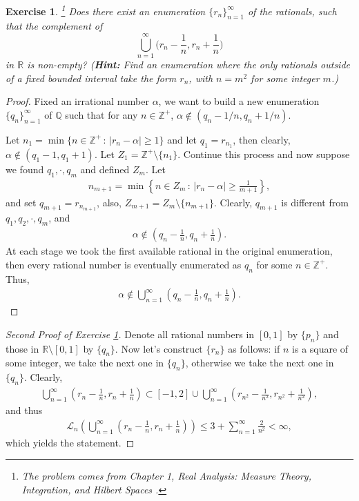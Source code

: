 \documentclass[11pt]{book}
\newtheorem{exercise}{Exercise}[chapter]
\theoremstyle{definition}
\numberwithin{equation}{chapter}
\def\L{{\mathcal L}}
\begin{document}
\begin{exercise}\label{exercise_115}\footnote{The problem comes from Chapter 1, {\em Real Analysis: Measure Theory, Integration, and Hilbert Spaces} \cite{8}.} Does there exist an enumeration $\{ r_n\}^\infty_{n=1}$ of the rationals, such that the complement of
$$
\bigcup^\infty_{n=1}\biggr(r_n-\frac{1}{n},r_n+\frac{1}{n}\biggr)
$$
in $\mathbb{R}$ is non-empty? ({\bf Hint:} Find an enumeration where the only rationals outside of a fixed bounded interval take the form $r_n$, with $n = m^2$ for some integer $m$.)
\end{exercise}
\begin{proof}\cite{19}
Fixed an irrational number $\alpha$, we want to build a new enumeration $\{q_n\}^\infty_{n=1}$ of $\mathbb{Q}$ such that for any $n \in \mathbb{Z}^+$, $\alpha \notin \left(q_n - 1/n, q_n + 1/n\right)$.

Let $n_1 = \min\{n \in \mathbb{Z}^+ \,:\, \left|r_n - \alpha\right| \geq 1 \}$ and let $q_1 = r_{n_1}$, then clearly, $\alpha \notin (q_1 - 1, q_1 + 1)$. Let $Z_1 = \mathbb{Z}^+ \setminus \{n_1\}$. Continue this process and now suppose we found $q_1,\cdot,q_m$ and defined $Z_m$. Let 
\begin{align*}
    n_{m+1} = \min \left\{n \in Z_m \,:\, \left|r_n - \alpha\right| \geq \frac{1}{m+1}\right\},
\end{align*}
and set $q_{m+1} = r_{n_{m+1}}$, also, $Z_{m+1} = Z_m\setminus \{n_{m+1}\}$. Clearly, $q_{m+1}$ is different from $q_1,q_2,\cdot,q_m$, and 
\begin{align*}
    \alpha \notin \left(q_n - \frac{1}{n}, q_n + \frac{1}{n}\right).
\end{align*}
At each stage we took the first available rational in the original enumeration, then every rational number is eventually enumerated as $q_n$ for some $n \in \mathbb{Z}^+$. Thus, 
\begin{align*}
    \alpha \notin \bigcup^\infty_{n=1}\left(q_n - \frac{1}{n}, q_n + \frac{1}{n}\right).
\end{align*}
\end{proof}

\medskip

\begin{proof}[Second Proof of Exercise \ref{exercise_115}]\cite{20} 
Denote all rational numbers in $[0,1]$ by $\{p_n\}$ and those in $\mathbb{R} \setminus [0,1]$ by $\{q_n\}$. Now let's construct $\{r_n\}$ as follows: if $n$ is a square of some integer, we take the next one in $\{q_n\}$, otherwise we take the next one in $\{q_n\}$. Clearly, 
\begin{align*}
    \bigcup^\infty_{n=1}\left(r_n - \frac{1}{n}, r_n + \frac{1}{n}\right) \subset [-1,2] \cup \bigcup^\infty_{n=1} \left(r_{n^2} - \frac{1}{n^2}, r_{n^2} + \frac{1}{n^2}\right),
\end{align*}
and thus 
\begin{align*}
    \L_n\left(\bigcup^\infty_{n=1}\left(r_n - \frac{1}{n}, r_n + \frac{1}{n}\right)\right) \leq 3 + \sum^\infty_{n=1} \frac{2}{n^2} < \infty,
\end{align*}
which yields the statement.
\end{proof}
\end{document}
